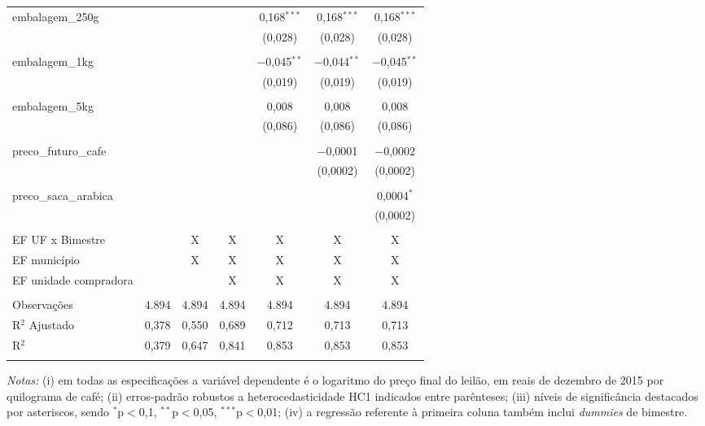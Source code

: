 \begin{table}[!htbp]
\begin{threeparttable}
\begin{tabular}{lcccccc}
embalagem\_250g &  &  &  & 0,168$^{***}$ & 0,168$^{***}$ & 0,168$^{***}$ \\ 
  &  &  &  & (0,028) & (0,028) & (0,028) \\ 
  & & & & & & \\ 

embalagem\_1kg &  &  &  & $-$0,045$^{**}$ & $-$0,044$^{**}$ & $-$0,045$^{**}$ \\
  &  &  &  & (0,019) & (0,019) & (0,019) \\ 
  & & & & & & \\ 

embalagem\_5kg &  &  &  & 0,008 & 0,008 & 0,008 \\ 
  &  &  &  & (0,086) & (0,086) & (0,086) \\ 
  & & & & & & \\ 

preco\_futuro\_cafe &  &  &  &  & $-$0,0001 & $-$0,0002 \\ 
  &  &  &  &  & (0,0002) & (0,0002) \\ 
  & & & & & & \\

preco\_saca\_arabica  &  &  &  &  & & 0,0004$^{*}$ \\ 
  &  &  &  &  & & (0,0002) \\ 
  & & & & & & \\ 


 EF UF x Bimestre  &  & X & X & X & X & X \\ 
 EF município  &  & X & X & X & X & X \\ 
 EF unidade compradora  &  &  & X & X & X & X \\ 
\hline \\[-1.8ex] 

Observações & 4.894 & 4.894 & 4.894 & 4.894 & 4.894 & 4.894 \\ 
R$^{2}$ Ajustado & 0,378 & 0,550 & 0,689 & 0,712 & 0,713 & 0,713 \\ 
R$^{2}$ & 0,379 & 0,647 & 0,841 & 0,853 & 0,853 & 0,853 \\ 
\hline 

\hline \\[-1.8ex] 
\end{tabular}
\begin{tablenotes}
\footnotesize
\emph{Notas:} (i) em todas as especificações a variável dependente é o logaritmo do preço final do leilão, em reais de dezembro de 2015 por quilograma de café; (ii) erros-padrão robustos a heterocedasticidade HC1 indicados entre parênteses; (iii) níveis de significância destacados por asteriscos, sendo  $^{*}$p$<$0,1, $^{**}$p$<$0,05, $^{***}$p$<$0,01; (iv) a regressão referente à primeira coluna também inclui \textit{dummies} de bimestre.\\ 
\end{tablenotes}
\end{threeparttable}
\end{table}